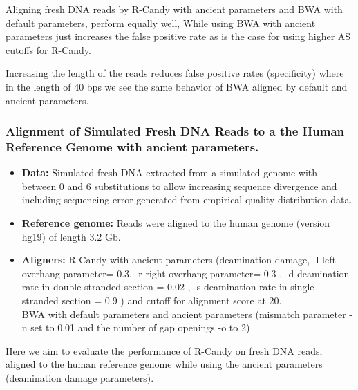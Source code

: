 \documentclass[11pt,a4paper]{report}
\begin{document}
Aligning fresh DNA reads by R-Candy with ancient parameters and BWA with default 
parameters, perform equally well, While using BWA with ancient parameters just 
increases the false positive rate as is the case for using higher AS cutoffs for 
R-Candy.

Increasing the length of the reads reduces false positive rates (specificity)  
where in the length of 40 bps we see the same behavior of BWA aligned by default
and ancient parameters.




\subsubsection{ Alignment of Simulated Fresh DNA Reads to a the Human Reference Genome
with ancient parameters.}

\label{ Alignment of Simulated Fresh DNA Reads to a the Human Reference Genome.}


 \begin{itemize}
 
   \item \textbf{Data:} Simulated fresh DNA extracted from a simulated genome 
   with between 0 and 6 substitutions to allow increasing sequence divergence
   and including sequencing error generated from empirical quality distribution
   data.
   
   \item \textbf{Reference genome:} Reads were aligned to the human genome 
   (version hg19) of length 3.2 Gb.

    \item \textbf{Aligners:}
    R-Candy with ancient parameters 
  	(deamination damage, -l left overhang parameter= 0.3, -r right overhang parameter= 0.3 , 
	-d deamination rate in double stranded section = 0.02 , 
	-s deamination rate in single stranded section = 0.9 )
  	and cutoff for alignment score at 20. \\
  	BWA with default parameters and ancient parameters \cite{green2010draft}
   	(mismatch parameter -n set to 0.01 and the number of gap openings -o
   	to 2)
   
 \end{itemize}
	
	
Here we aim to evaluate the performance of R-Candy on fresh DNA reads, 
aligned to the human reference genome while using the ancient parameters
(deamination damage parameters).
\end{document}
